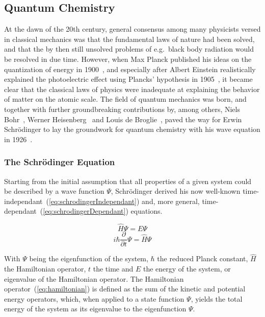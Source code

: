 \documentclass[11pt]{article}
\begin{document}
\subsection{Quantum Chemistry}
At the dawn of the 20th century, general consensus among many physicists versed in classical mechanics was that the
fundamental laws of nature had been solved, and that the by then still unsolved problems of e.g.~black body radiation
would be resolved in due time. However, when Max Planck published his ideas on the quantization of energy in 1900~\cite{Planck1901}, and especially
after Albert Einstein realistically explained the photoelectric effect using Plancks' hypothesis in 1905~\cite{Einstein1905}, it became clear that the classical laws of physics were 
inadequate at explaining the behavior of matter on the atomic scale.
The field of quantum mechanics was born, and together with further groundbreaking contributions by, among others, Niels Bohr~\cite{Bohr1913}, Werner Heisenberg~\cite{Heisenberg1927} and Louis de Broglie~\cite{Broglie1924},
paved the way for Erwin Schrödinger to lay the groundwork for quantum chemistry with his wave equation in 1926~\cite{Schrdinger1926}\cite{Schrdinger1926-2}.
\subsubsection{The Schrödinger Equation}
Starting from the initial assumption that all properties of a given system could be described by a wave function $\Psi$, Schrödinger derived his now well-known
time-independant~(\ref{eq:schrodingerIndependant}) and, more general, time-dependant~(\ref{eq:schrodingerDependant}) equations.


\begin{equation}
  \hat{H}\Psi = E\Psi
  \label{eq:schrodingerIndependant}
\end{equation}
\begin{equation}
  i\hbar\frac{\partial}{\partial t}\Psi = \hat{H}\Psi
  \label{eq:schrodingerDependant}
\end{equation}

\bigskip

\noindent With $\Psi$ being the eigenfunction of the system, $\hbar$ the reduced Planck constant, $\hat{H}$ the Hamiltonian operator, $t$ the time and $E$ the energy of the system, or eigenvalue of the Hamiltonian operator.
The Hamiltonian operator~(\ref{eq:hamiltonian}) is defined as the sum of the kinetic and potential energy operators, which, when applied to a state function $\Psi$, yields the total energy of the system as its eigenvalue to the eigenfunction $\Psi$.
\end{document}

